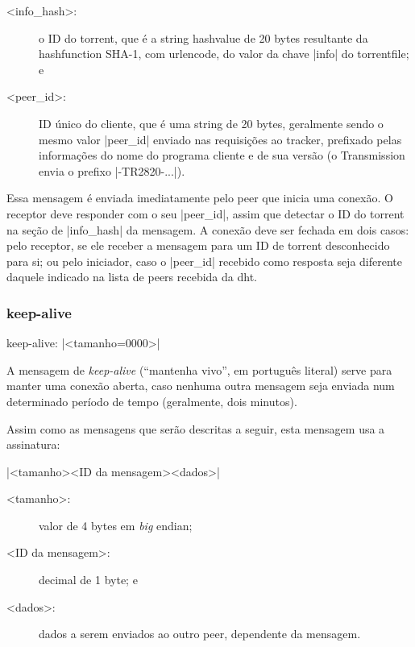 \begin{description}
    \item[<info\_hash>:] o ID do \gls*{torrent}, que é a \gls*{string}
        \gls*{hashvalue} de 20 bytes resultante da \gls*{hashfunction} SHA-1, com
        \gls*{urlencode}, do valor da chave \bverb|info| do \gls*{torrentfile}; e

    \item[<peer\_id>:] ID único do cliente, que é uma \gls*{string} de 20 bytes,
        geralmente sendo o mesmo valor \bverb|peer_id| enviado nas requisições ao
        \gls*{tracker}, prefixado pelas informações do nome do programa cliente e de sua
        versão (o Transmission envia o prefixo \sverb|-TR2820-...|).
\end{description}


Essa mensagem é enviada imediatamente pelo \gls*{peer} que inicia uma conexão. O
receptor deve responder com o seu \bverb|peer_id|, assim que detectar o ID do
\gls*{torrent} na seção de \bverb|info_hash| da mensagem. A conexão deve ser fechada em
dois casos: pelo receptor, se ele receber a mensagem para um ID de \gls*{torrent}
desconhecido para si; ou pelo iniciador, caso o \bverb|peer_id| recebido como resposta
seja diferente daquele indicado na lista de \glspl*{peer} recebida da \gls*{dht}.

\subsubsection*{keep-alive}

keep-alive: \bverb|<tamanho=0000>|

A mensagem de \emph{keep-alive} (``mantenha vivo'', em português literal) serve para
manter uma conexão aberta, caso nenhuma outra mensagem seja enviada num determinado
período de tempo (geralmente, dois minutos).

\newpage
Assim como as mensagens que serão descritas a seguir, esta mensagem usa a assinatura:

\bverb|<tamanho><ID da mensagem><dados>|

\begin{description}
    \item[<tamanho>:] valor de 4 bytes em \emph{big} \gls{endian};

    \item[<ID da mensagem>:] decimal de 1 byte; e

    \item[<dados>:] dados a serem enviados ao outro \gls*{peer}, dependente da
        mensagem.
\end{description}

